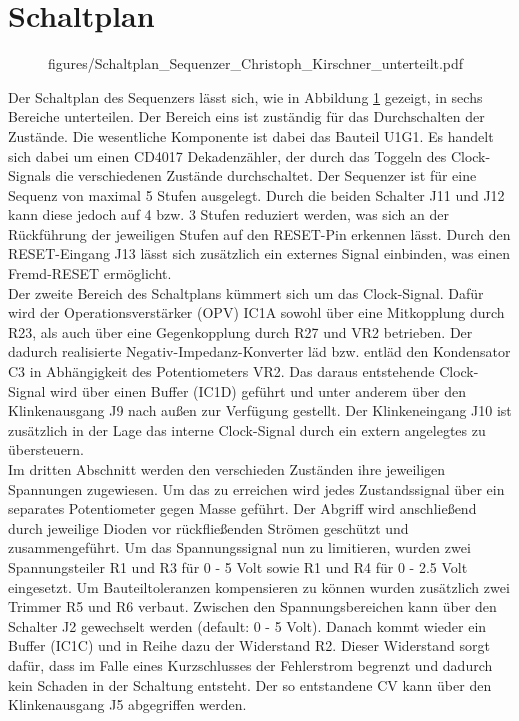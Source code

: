 \section{Schaltplan}
\newpage	%

\begin{figure}[h]
	\centering
	 {figures/Schaltplan_Sequenzer_Christoph_Kirschner_unterteilt.pdf}
	\label{fig:In_Bereiche_unterteilter_Schaltplan_des_Sequenzers}
\end{figure}

\newpage	%
Der Schaltplan des Sequenzers lässt sich, wie in Abbildung \ref{fig:In_Bereiche_unterteilter_Schaltplan_des_Sequenzers} gezeigt, in sechs Bereiche unterteilen. Der Bereich eins ist zuständig für das Durchschalten der Zustände. Die wesentliche Komponente ist dabei das Bauteil U1G1. Es handelt sich dabei um einen CD4017 Dekadenzähler, der durch das Toggeln des Clock-Signals die verschiedenen Zustände durchschaltet. Der Sequenzer ist für eine Sequenz von maximal 5 Stufen ausgelegt. Durch die beiden Schalter J11 und J12 kann diese jedoch auf 4 bzw. 3 Stufen reduziert werden, was sich an der Rückführung der jeweiligen Stufen auf den RESET-Pin erkennen lässt. Durch den RESET-Eingang J13 lässt sich zusätzlich ein externes Signal einbinden, was einen Fremd-RESET ermöglicht.\\
Der zweite Bereich des Schaltplans kümmert sich um das Clock-Signal. Dafür wird der Operationsverstärker (OPV) IC1A sowohl über eine Mitkopplung durch R23, als auch über eine Gegenkopplung durch R27 und VR2 betrieben. Der dadurch realisierte Negativ-Impedanz-Konverter läd bzw. entläd den Kondensator C3 in Abhängigkeit des Potentiometers VR2. Das daraus entstehende Clock-Signal wird über einen Buffer (IC1D) geführt und unter anderem über den Klinkenausgang J9 nach außen zur Verfügung gestellt. Der Klinkeneingang J10 ist zusätzlich in der Lage das interne Clock-Signal durch ein extern angelegtes zu übersteuern.\\
Im dritten Abschnitt werden den verschieden Zuständen ihre jeweiligen Spannungen zugewiesen. Um das zu erreichen wird jedes Zustandssignal über ein separates Potentiometer gegen Masse geführt. Der Abgriff wird anschließend durch jeweilige Dioden vor rückfließenden Strömen geschützt und zusammengeführt. Um das Spannungssignal nun zu limitieren, wurden zwei Spannungsteiler R1 und R3 für 0 - 5 Volt sowie R1 und R4 für 0 - 2.5 Volt eingesetzt. Um Bauteiltoleranzen kompensieren zu können wurden zusätzlich zwei Trimmer R5 und R6 verbaut. Zwischen den Spannungsbereichen kann über den Schalter J2 gewechselt werden (default: 0 - 5 Volt). Danach kommt wieder ein Buffer (IC1C) und in Reihe dazu der Widerstand R2. Dieser Widerstand sorgt dafür, dass im Falle eines Kurzschlusses der Fehlerstrom begrenzt und dadurch kein Schaden in der Schaltung entsteht. Der so entstandene CV kann über den Klinkenausgang J5 abgegriffen werden.\\
